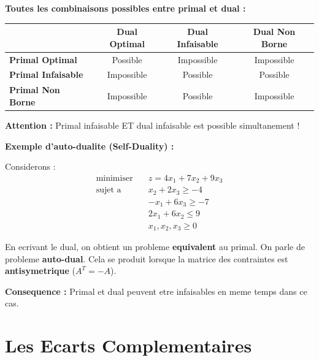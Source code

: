\documentclass[12pt,a4paper]{article}
\begin{document}
\begin{important}
\textbf{Toutes les combinaisons possibles entre primal et dual :}

\begin{center}
\begin{tabular}{l|c|c|c}
\toprule
& \textbf{Dual Optimal} & \textbf{Dual Infaisable} & \textbf{Dual Non Borne} \\
\midrule
\textbf{Primal Optimal} & \textcolor{defvert}{Possible} & Impossible & Impossible \\
\textbf{Primal Infaisable} & Impossible & \textcolor{defvert}{Possible} & \textcolor{defvert}{Possible} \\
\textbf{Primal Non Borne} & Impossible & \textcolor{defvert}{Possible} & Impossible \\
\bottomrule
\end{tabular}
\end{center}

\textcolor{importantrouge}{\textbf{Attention :}} Primal infaisable ET dual infaisable est possible simultanement !
\end{important}

\begin{exemple}
\textbf{Exemple d'auto-dualite (Self-Duality) :}

Considerons :
\begin{align*}
\text{minimiser} \quad & z = 4x_1 + 7x_2 + 9x_3\\
\text{sujet a} \quad & x_2 + 2x_3 \geq -4\\
& -x_1 + 6x_3 \geq -7\\
& 2x_1 + 6x_2 \leq 9\\
& x_1, x_2, x_3 \geq 0
\end{align*}

En ecrivant le dual, on obtient un probleme \textcolor{algoviolet}{\textbf{equivalent}} au primal. On parle de probleme \textbf{auto-dual}. Cela se produit lorsque la matrice des contraintes est \textcolor{importantrouge}{\textbf{antisymetrique}} ($A^T = -A$).

\textbf{Consequence :} Primal et dual peuvent etre infaisables en meme temps dans ce cas.
\end{exemple}

\section{Les Ecarts Complementaires}
\end{document}
